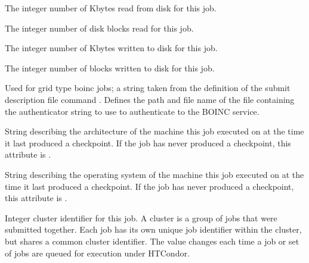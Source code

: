 \begin{description}
\item[\AdAttr{BlockReadKbytes}:] The integer number of Kbytes
read from disk for this job.

\item[\AdAttr{BlockReads}:] The integer number of disk blocks
read for this job.

\item[\AdAttr{BlockWriteKbytes}:] The integer number of Kbytes
written to disk for this job.

\item[\AdAttr{BlockWrites}:] The integer number of blocks
written to disk for this job.

\item[\AdAttr{BoincAuthenticatorFile}:] 
Used for grid type boinc jobs;
a string taken from the definition of the submit description file command
.
Defines the path and file name of the file containing the authenticator
string to use to authenticate to the BOINC service.

\item[\AdAttr{CkptArch}:]  String describing the architecture of the machine
this job executed on at the time it last produced a checkpoint.
If the job has never produced a checkpoint,
this attribute is .

\item[\AdAttr{CkptOpSys}:]  String describing the operating system of
the machine
this job executed on at the time it last produced a checkpoint.
If the job has never produced a checkpoint,
this attribute is .

\item[\AdAttr{ClusterId}:]  Integer cluster identifier for this job.
A cluster is a group of jobs that were submitted together.  Each
job has its own unique job identifier within the cluster, but shares a
common cluster identifier.
The value changes each time a job or set of jobs are queued for
execution under HTCondor.


\end{description}
